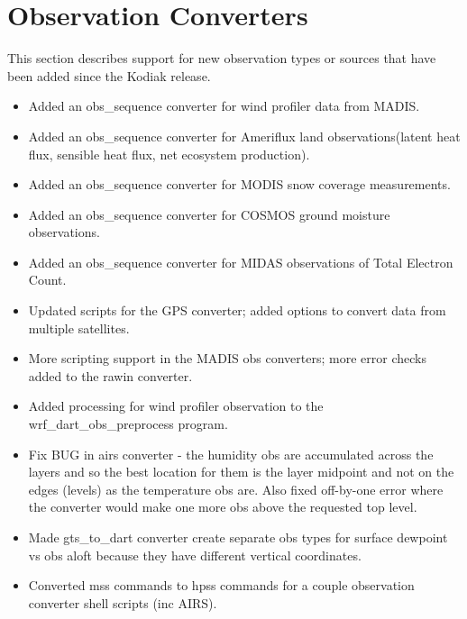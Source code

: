 \documentclass[letterpaper,10pt,english]{sphinxmanual}
\begin{document}
\section{Observation Converters}
\label{docs/Lanai_diffs_from_Kodiak:observation-converters}
This section describes support for new observation types or sources that
have been added since the Kodiak release.
\begin{itemize}
\item {} 
Added an obs\_sequence converter for wind profiler data from MADIS.

\item {} 
Added an obs\_sequence converter for Ameriflux land
observations(latent heat flux, sensible heat flux, net ecosystem
production).

\item {} 
Added an obs\_sequence converter for MODIS snow coverage
measurements.

\item {} 
Added an obs\_sequence converter for COSMOS ground moisture
observations.

\item {} 
Added an obs\_sequence converter for MIDAS observations of Total
Electron Count.

\item {} 
Updated scripts for the GPS converter; added options to convert data
from multiple satellites.

\item {} 
More scripting support in the MADIS obs converters; more error
checks added to the rawin converter.

\item {} 
Added processing for wind profiler observation to the
wrf\_dart\_obs\_preprocess program.

\item {} 
Fix BUG in airs converter - the humidity obs are accumulated across
the layers and so the best location for them is the layer midpoint
and not on the edges (levels) as the temperature obs are. Also fixed
off-by-one error where the converter would make one more obs above
the requested top level.

\item {} 
Made gts\_to\_dart converter create separate obs types for surface
dewpoint vs obs aloft because they have different vertical
coordinates.

\item {} 
Converted mss commands to hpss commands for a couple observation
converter shell scripts (inc AIRS).


\end{itemize}
\end{document}
